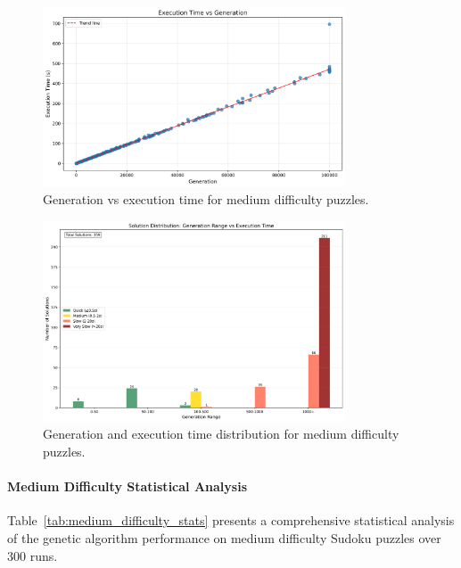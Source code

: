 \begin{figure}[H]
\centering
\includegraphics[width=0.8\textwidth]{resources/generation_vs_execution_time_medium.png}
\caption{Generation vs execution time for medium difficulty puzzles.}
\label{fig:generation_vs_execution_time_medium}
\end{figure}

\begin{figure}[H]
\centering
\includegraphics[width=0.8\textwidth]{resources/generation_execution_time_bars_medium.png}
\caption{Generation and execution time distribution for medium difficulty puzzles.}
\label{fig:generation_execution_time_bars_medium}
\end{figure}

\paragraph{Medium Difficulty Statistical Analysis}

Table~\ref{tab:medium_difficulty_stats} presents a comprehensive statistical analysis of the genetic algorithm performance on medium difficulty Sudoku puzzles over 300 runs.

